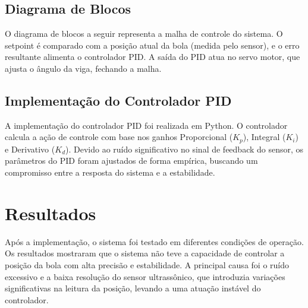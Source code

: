 \documentclass[a4paper, 11pt]{article}
\begin{document}
\subsection{Diagrama de Blocos}
O diagrama de blocos a seguir representa a malha de controle do sistema. O setpoint é comparado com a posição atual da bola (medida pelo sensor), e o erro resultante alimenta o controlador PID. A saída do PID atua no servo motor, que ajusta o ângulo da viga, fechando a malha.


\subsection{Implementação do Controlador PID}
A implementação do controlador PID foi realizada em Python. O controlador calcula a ação de controle com base nos ganhos Proporcional ($K_p$), Integral ($K_i$) e Derivativo ($K_d$). Devido ao ruído significativo no sinal de feedback do sensor, os parâmetros do PID foram ajustados de forma empírica, buscando um compromisso entre a resposta do sistema e a estabilidade.

\section{Resultados}
Após a implementação, o sistema foi testado em diferentes condições de operação. Os resultados mostraram que o sistema não teve a capacidade de controlar a posição da bola com alta precisão e estabilidade. A principal causa foi o ruído excessivo e a baixa resolução do sensor ultrassônico, que introduzia variações significativas na leitura da posição, levando a uma atuação instável do controlador.
\end{document}

